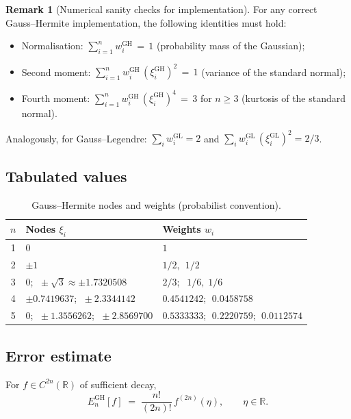 \documentclass[11pt,a4paper]{article}
\theoremstyle{definition}
\newtheorem{remark}[theorem]{Remark}
\newcommand{\R}{\mathbb{R}}
\newcommand{\GL}{\mathrm{GL}}
\newcommand{\GH}{\mathrm{GH}}
\begin{document}
\begin{remark}[Numerical sanity checks for implementation]\label{rmk:sanity}
For any correct Gauss--Hermite implementation, the following identities must
hold:
\begin{itemize}\itemsep0pt
  \item Normalisation: $\sum_{i=1}^n w_i^{\GH} \,=\, 1$
        (probability mass of the Gaussian);
  \item Second moment: $\sum_{i=1}^n w_i^{\GH}\,(\xi_i^{\GH})^2 \,=\, 1$
        (variance of the standard normal);
  \item Fourth moment: $\sum_{i=1}^n w_i^{\GH}\,(\xi_i^{\GH})^4 \,=\, 3$
        for $n\ge 3$ (kurtosis of the standard normal).
\end{itemize}
Analogously, for Gauss--Legendre: $\sum_i w_i^{\GL}=2$ and
$\sum_i w_i^{\GL}\,(\xi_i^{\GL})^2 = 2/3$.
\end{remark}

\subsection{Tabulated values}

\begin{table}[ht]
\centering
\caption{Gauss--Hermite nodes and weights (probabilist convention).}
\label{tab:GH-table}
\begin{tabular}{c l l}
\toprule
$n$ & Nodes $\xi_i$ & Weights $w_i$ \\
\midrule
1 & $0$
  & $1$ \\
2 & $\pm 1$
  & $1/2,\;\,1/2$ \\
3 & $0$; $\;\pm\sqrt{3}\approx\pm 1.7320508$
  & $2/3$; $\;\,1/6,\;1/6$ \\
4 & $\pm 0.7419637$; $\;\pm 2.3344142$
  & $0.4541242$; $\;0.0458758$ \\
5 & $0$; $\;\pm 1.3556262$; $\;\pm 2.8569700$
  & $0.5333333$; $\;0.2220759$; $\;0.0112574$ \\
\bottomrule
\end{tabular}
\end{table}

\subsection{Error estimate}

For $f\in C^{2n}(\R)$ of sufficient decay,
\begin{equation}
  E_n^{\GH}[f] \;=\; \frac{n!}{(2n)!}\,f^{(2n)}(\eta),
  \qquad \eta\in\R.
  \label{eq:GH-error}
\end{equation}
\end{document}
